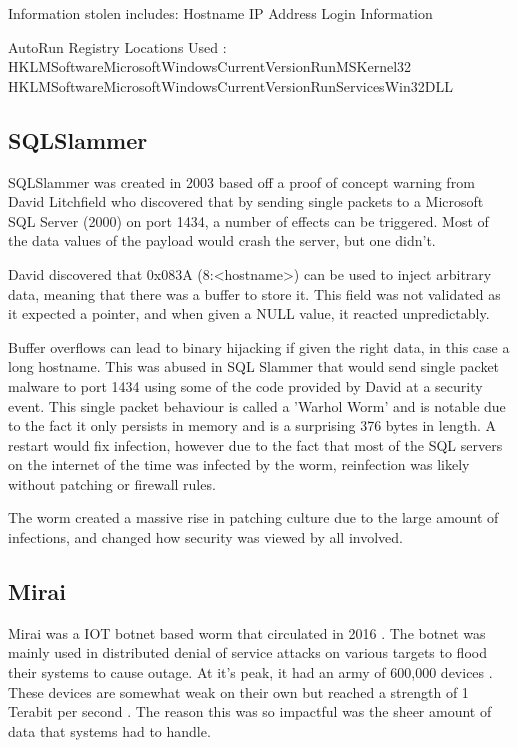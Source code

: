 Information stolen includes:
Hostname
IP Address
Login Information

AutoRun Registry Locations Used \citep{Loveletter}:
HKLMSoftwareMicrosoftWindowsCurrentVersionRunMSKernel32 
HKLMSoftwareMicrosoftWindowsCurrentVersionRunServicesWin32DLL 

\subsection{SQLSlammer}
SQLSlammer was created in 2003 based off a proof of concept warning from David Litchfield who discovered that by sending single packets to a Microsoft SQL Server (2000) on port 1434, a number of effects can be triggered.
Most of the data values of the payload would crash the server, but one didn't. \citep{SQLSlammerStory}

David discovered that 0x083A (8:<hostname>) can be used to inject arbitrary data, meaning that there was a buffer to store it. 
This field was not validated as it expected a pointer, and when given a NULL value, it reacted unpredictably.  \citep{SQLSlammerStory}

Buffer overflows can lead to binary hijacking if given the right data, in this case a long hostname. This was abused in SQL Slammer that would send single packet malware to port 1434 using some of the code provided by David at a security event.
This single packet behaviour is called a 'Warhol Worm' and is notable due to the fact it only persists in memory and is a surprising 376 bytes in length. \citep{SQLSlammer} A restart would fix infection, however due to the fact that most of the SQL servers on the internet of the time was infected by the worm,
reinfection was likely without patching or firewall rules.

The worm created a massive rise in patching culture due to the large amount of infections, and changed how security was viewed by all involved. \citep{SQLSlammerStory}

\subsection{Mirai}
Mirai was a IOT botnet based worm that circulated in 2016 \citep{Mirai}. The botnet was mainly used in distributed denial of service attacks on various targets to flood their systems to cause outage. At it's peak, it
had an army of 600,000 devices \citep{Mirai}. These devices are somewhat weak on their own but reached a strength of 1 Terabit per second \citep{Mirai}. The reason this was so impactful was the sheer amount of data that systems had to handle.

